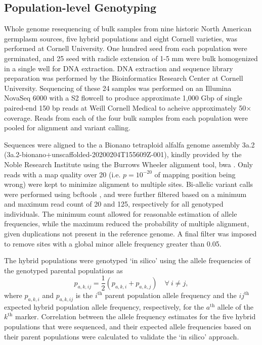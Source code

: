 \documentclass[12pt, letterpaper]{article}
\begin{document}




\subsection{Population-level Genotyping}

Whole genome resequencing of bulk samples from nine historic North American germplasm sources, five hybrid populations and eight Cornell varieties, was performed at Cornell University. One hundred seed from each population were germinated, and 25 seed with radicle extension of 1-5 mm were bulk homogenized in a single well for DNA extraction. DNA extraction and sequence library preparation was performed by the Bioinformatics Research Center at Cornell University. Sequencing of these 24 samples was performed on an Illumina NovaSeq 6000 with a S2 flowcell to produce approximate 1,000 Gbp of single paired-end 150 bp reads at Weill Cornell Medical to acheive approximately 50$\times$ coverage. Reads from each of the four bulk samples from each population were pooled for alignment and variant calling. 

Sequences were aligned to the a Bionano tetraploid alfalfa genome assembly 3a.2 (3a.2-bionano+unscaffolded-20200204T155609Z-001), kindly provided by the Noble Research Institute using the Burrows Wheeler alignment tool, bwa \parencite{li2009}. Only reads with a map quality over 20 (i.e. $p = 10^{-20}$ of mapping position being wrong) were kept to minimize alignment to multiple sites. Bi-allelic variant calls were performed using bcftools \parencite[SAMtools]{li2011}, and were further filtered based on a minimum and maximum read count of 20 and 125, respectively for all genotyped individuals. The minimum count allowed for reasonable estimation of allele frequencies, while the maximum reduced the probability of multiple alignment, given duplications not present in the reference genome. A final filter was imposed to remove sites with a global minor allele frequency greater than 0.05.

The hybrid populations were genotyped `in silico' using the allele frequencies of the genotyped parental populations as
\[p_{a,k,ij} = \frac{1}{2} (p_{a,k,i} + p_{a,k,j}) \quad \forall \ i \neq j,\]
\noindent where $p_{a,k,i}$ and $p_{a,k,ij}$ is the $i^\text{th}$ parent population allele frequency and the $ij^\text{th}$ expected hybrid population allele frequency, respectively, for the $a^\text{th}$ allele of the $k^\text{th}$ marker. Correlation between the allele frequency estimates for the five hybrid populations that were sequenced, and their expected allele frequencies based on their parent populations were calculated to validate the `in silico' approach.
\end{document}
